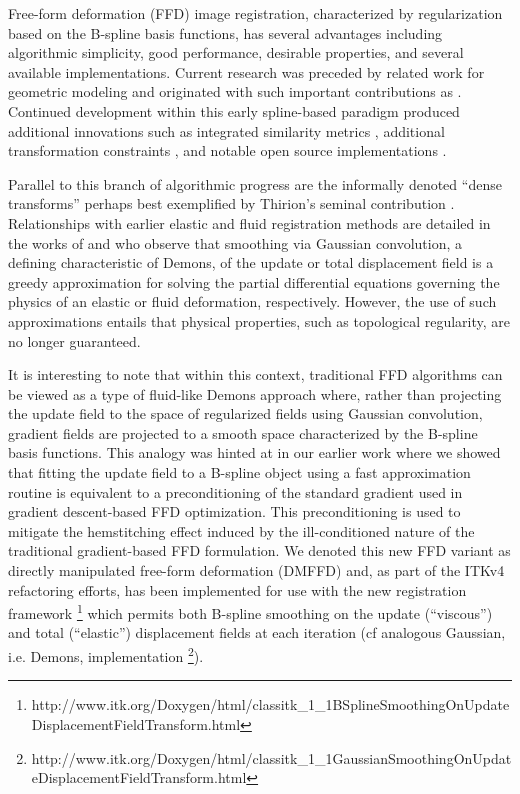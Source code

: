 \documentclass{frontiersSCNS}
\begin{document}
Free-form deformation (FFD) image registration, characterized by
regularization based on the B-spline basis functions, has several
advantages including algorithmic simplicity, good performance,
desirable properties, and several available implementations.  Current
research was preceded by related work for geometric modeling
\citep{sederberg1986} and originated with such important contributions
as \cite{szeliski1997,thevenaz1998,rueckert1999}.  Continued
development within this early spline-based paradigm produced
additional innovations such as integrated similarity metrics
\citep[e.g.][]{mattes2003}, additional transformation constraints
\citep[e.g.][]{rohlfing2003}, and notable open source implementations
\citep[e.g.][]{ibanez2005,klein2010,modat2010,shackleford2010}.

Parallel to this branch of algorithmic progress are the informally
denoted ``dense transforms'' perhaps best exemplified by Thirion's
seminal contribution \citep{thirion1998}.  Relationships with earlier
elastic \citep{bajcsy1989,gee1993} and fluid \citep{christensen1996}
registration methods are detailed in the works of
\cite{bro-nielsen1996} and \cite{pennec1999} who observe that
smoothing via Gaussian convolution, a defining characteristic of
Demons, of the update or total displacement field is a greedy
approximation for solving the partial differential equations governing
the physics of an elastic or fluid deformation, respectively.
However, the use of such approximations entails that physical
properties, such as topological regularity, are no longer guaranteed.

It is interesting to note that within this context, traditional FFD
algorithms can be viewed as a type of fluid-like Demons approach
where, rather than projecting the update field to the space of
regularized fields using Gaussian convolution, gradient fields are
projected to a smooth space characterized by the B-spline basis
functions.  This analogy was hinted at in our earlier work
\citep{tustison2009} where we showed that fitting the update field to
a B-spline object using a fast approximation routine
\citep{tustison2006} is equivalent to a preconditioning of the
standard gradient used in gradient descent-based FFD optimization.
This preconditioning is used to mitigate the hemstitching effect
induced by the ill-conditioned nature of the traditional
gradient-based FFD formulation.  We denoted this new FFD variant as
directly manipulated free-form deformation (DMFFD) and, as part of the
ITKv4 refactoring efforts, has been implemented for use with the new
registration framework%
\footnote{
http://www.itk.org/Doxygen/html/classitk\_1\_1BSplineSmoothingOnUpdateDisplacementFieldTransform.html
}
which permits both B-spline smoothing on the update (``viscous'') and total (``elastic'')
displacement fields at each iteration (cf
analogous Gaussian, i.e. Demons, implementation%
\footnote{
http://www.itk.org/Doxygen/html/classitk\_1\_1GaussianSmoothingOnUpdateDisplacementFieldTransform.html
}).
\end{document}
